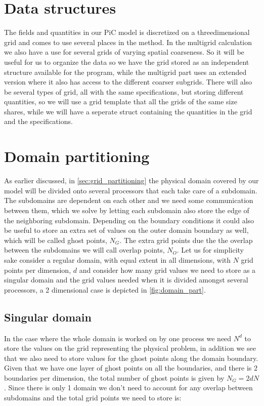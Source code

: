 	\section{Data structures}
	The fields and quantities in our PiC model is discretized on a threedimensional grid and comes to use several places in the method. In the multigrid calculation we also have a use for several grids of varying spatial coarseness. So it will be useful for us to organize the data so we have the grid stored as an independent structure available for the program, while the multigrid part uses an extended version where it also has access to the different coarser subgrids. There will also be several types of grid, all with the same specifications, but storing different quantities, so we will use a grid template that all the grids of the same size shares, while we will have a seperate struct containing the quantities in the grid and the specifications.



	\section{Domain partitioning}
		As earlier discussed, in \ref{sec:grid_partitioning} the physical domain covered by our model will be divided onto several processors that each take care of a subdomain. The subdomains are dependent on each other and we need some communication between them, which we solve by letting each subdomain also store the edge of the neighboring subdomain. Depending on the boundary conditions it could also be useful to store an extra set of values on the outer domain boundary as well, which will be called ghost points, \(N_G\). The extra grid points due the the overlap between the subdomains we will call overlap points, \(N_O\). Let us for simplicity sake consider a regular domain, with equal extent in all dimensions, with \(N\) grid points per dimension, \(d\) and consider how many grid values we need to store as a singular domain and the grid values needed when it is divided amongst several processors, a 2 dimensional case is depicted in \cref{fig:domain_part}.

		\subsection{Singular domain}
		In the case where the whole domain is worked on by one process we need \(N^d\) to store the values on the grid representing the physical problem, in addition we see that we also need to store values for the ghost points along the domain boundary. Given that we have one layer of ghost points on all the boundaries, and there is 2 boundaries per dimension, the total number of ghost points is given by \(N_G = 2dN\). Since there is only 1 domain we don't need to account for any overlap between subdomains and the total grid points we need to store is:

